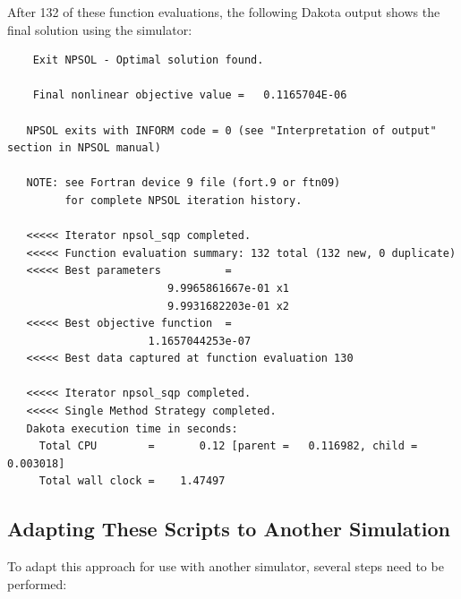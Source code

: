 After 132 of these function evaluations, the following Dakota output
shows the final solution using the  simulator:
\begin{small}
\begin{verbatim}
    Exit NPSOL - Optimal solution found.

    Final nonlinear objective value =   0.1165704E-06

   NPSOL exits with INFORM code = 0 (see "Interpretation of output" section in NPSOL manual)

   NOTE: see Fortran device 9 file (fort.9 or ftn09)
         for complete NPSOL iteration history.

   <<<<< Iterator npsol_sqp completed.
   <<<<< Function evaluation summary: 132 total (132 new, 0 duplicate)
   <<<<< Best parameters          =
                         9.9965861667e-01 x1
                         9.9931682203e-01 x2
   <<<<< Best objective function  =
                      1.1657044253e-07
   <<<<< Best data captured at function evaluation 130

   <<<<< Iterator npsol_sqp completed.
   <<<<< Single Method Strategy completed.
   Dakota execution time in seconds:
     Total CPU        =       0.12 [parent =   0.116982, child =   0.003018]
     Total wall clock =    1.47497
\end{verbatim}
\end{small}

\subsection{Adapting These Scripts to Another Simulation}

To adapt this approach for use with another simulator, several steps
need to be performed:

